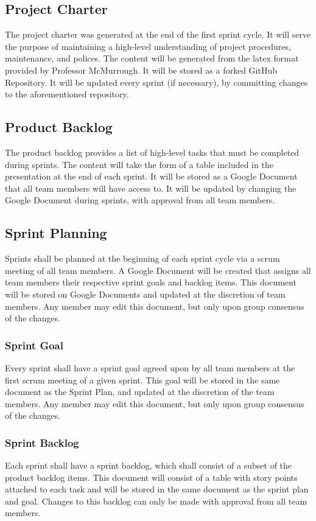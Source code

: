 \subsection{Project Charter}
The project charter was generated at the end of the first sprint cycle. It will serve the purpose of maintaining a high-level understanding of project procedures, maintenance, and polices. The content will be generated from the latex format provided by Professor McMurrough. It will be stored as a forked GitHub Repository. It will be updated every sprint (if necessary), by committing changes to the aforementioned repository.

\subsection{Product Backlog}
The product backlog provides a list of high-level tasks that must be completed during sprints. The content will take the form of a table included in the presentation at the end of each sprint. It will be stored as a Google Document that all team members will have access to. It will be updated by changing the Google Document during sprints, with approval from all team members. 

\subsection{Sprint Planning}
Sprints shall be planned at the beginning of each sprint cycle via a scrum meeting of all team members. A Google Document will be created that assigns all team members their respective sprint goals and backlog items. This document will be stored on Google Documents and updated at the discretion of team members. Any member may edit this document, but only upon group consensus of the changes.

\subsubsection{Sprint Goal}
Every sprint shall have a sprint goal agreed upon by all team members at the first scrum meeting of a given sprint. This goal will be stored in the same document as the Sprint Plan, and updated at the discretion of the team members. Any member may edit this document, but only upon group consensus of the changes.

\subsubsection{Sprint Backlog}
Each sprint shall have a sprint backlog, which shall consist of a subset of the product backlog items. This document will consist of a table with story points attached to each task and will be stored in the same document as the sprint plan and goal. Changes to this backlog can only be made with approval from all team members.

